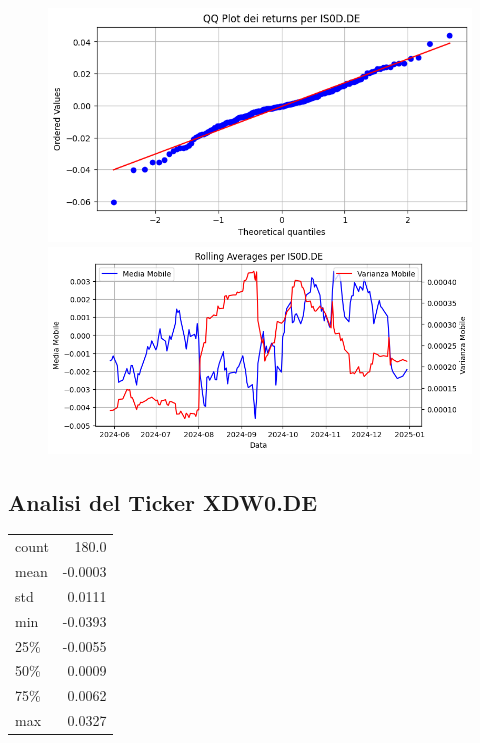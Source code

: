 \documentclass{article}%
\begin{document}
%


\begin{figure}[htbp]%
\begin{minipage}{0.48\textwidth}%
\includegraphics[width=\linewidth]{immagini_tickers/IS0D.DE_qq_plot.png}%
\end{minipage}%
\begin{minipage}{0.48\textwidth}%
\includegraphics[width=\linewidth]{immagini_tickers/IS0D.DE_rolling_averages.png}%
\end{minipage}%
\end{figure}

%
\subsection*{Analisi del Ticker XDW0.DE}%
\label{subsec:AnalisidelTickerXDW0.DE}%
\begin{tabular}{lr}%
count&180.0\\%
mean&{-}0.0003\\%
std&0.0111\\%
min&{-}0.0393\\%
25\%&{-}0.0055\\%
50\%&0.0009\\%
75\%&0.0062\\%
max&0.0327\\%
\end{tabular}%
\end{document}
